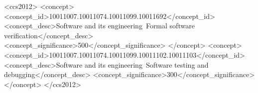 \documentclass[sigconf,screen]{acmart}
\begin{document}

\begin{CCSXML}
<ccs2012>
<concept>
<concept_id>10011007.10011074.10011099.10011692</concept_id>
<concept_desc>Software and its engineering~Formal software verification</concept_desc>
<concept_significance>500</concept_significance>
</concept>
<concept>
<concept_id>10011007.10011074.10011099.10011102.10011103</concept_id>
<concept_desc>Software and its engineering~Software testing and debugging</concept_desc>
<concept_significance>300</concept_significance>
</concept>
</ccs2012>
\end{CCSXML}



\maketitle










\end{document}
